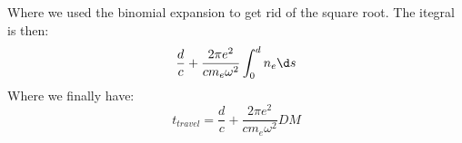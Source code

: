 Where we used the binomial expansion to get rid of the square root.
The itegral is then:
\begin{equation}
    \frac{d}{c}+\frac{2\pi e^2}{c m_e\omega^2}\int_{0}^{d}n_e \d s
\end{equation}
Where we finally have:
\begin{equation}
    t_{travel} = \frac{d}{c}+\frac{2\pi e^2}{c m_e\omega^2}DM
\end{equation}
